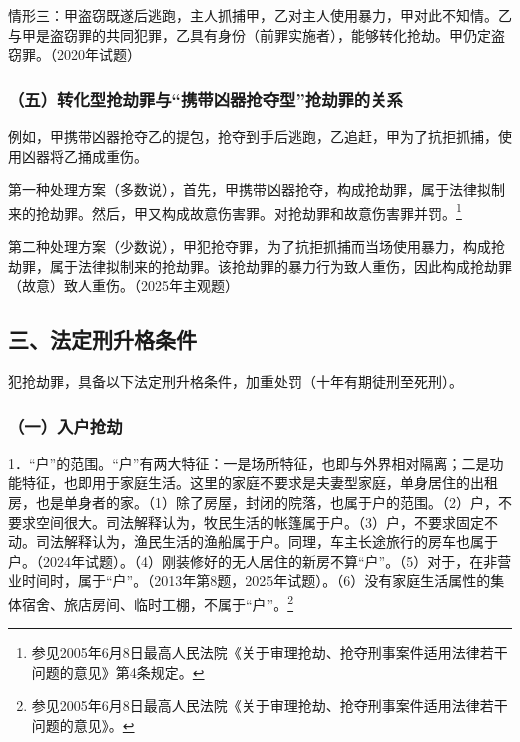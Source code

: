 情形三：甲盗窃既遂后逃跑，主人抓捕甲，乙对主人使用暴力，甲对此不知情。乙与甲是盗窃罪的共同犯罪，乙具有身份（前罪实施者），能够转化抢劫。甲仍定盗窃罪。（2020年试题）

\subsubsection*{（五）转化型抢劫罪与“携带凶器抢夺型”抢劫罪的关系}

例如，甲携带凶器抢夺乙的提包，抢夺到手后逃跑，乙追赶，甲为了抗拒抓捕，使用凶器将乙捅成重伤。

第一种处理方案（多数说），首先，甲携带凶器抢夺，构成抢劫罪，属于法律拟制来的抢劫罪。然后，甲又构成故意伤害罪。对抢劫罪和故意伤害罪并罚。\footnote{参见2005年6月8日最高人民法院《关于审理抢劫、抢夺刑事案件适用法律若干问题的意见》第4条规定。}

第二种处理方案（少数说），甲犯抢夺罪，为了抗拒抓捕而当场使用暴力，构成抢劫罪，属于法律拟制来的抢劫罪。该抢劫罪的暴力行为致人重伤，因此构成抢劫罪（故意）致人重伤。（2025年主观题）

\subsection*{三、法定刑升格条件\protect\footnotemark}

犯抢劫罪，具备以下法定刑升格条件，加重处罚（十年有期徒刑至死刑）。

\subsubsection*{（一）入户抢劫}

1．“户”的范围。“户”有两大特征：一是场所特征，也即与外界相对隔离；二是功能特征，也即用于家庭生活。这里的家庭不要求是夫妻型家庭，单身居住的出租房，也是单身者的家。（1）除了房屋，封闭的院落，也属于户的范围。（2）户，不要求空间很大。司法解释认为，牧民生活的帐篷属于户。（3）户，不要求固定不动。司法解释认为，渔民生活的渔船属于户。同理，车主长途旅行的房车也属于户。（2024年试题）。（4）刚装修好的无人居住的新房不算“户”。（5）对于，在非营业时间时，属于“户”。（2013年第8题，2025年试题）。（6）没有家庭生活属性的集体宿舍、旅店房间、临时工棚，不属于“户”。\footnote{参见2005年6月8日最高人民法院《关于审理抢劫、抢夺刑事案件适用法律若干问题的意见》。}

